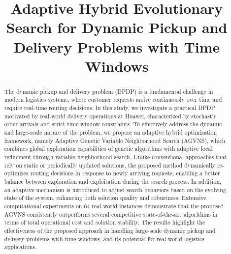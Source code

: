 \documentclass[]{interact}
\begin{document}
\title{Adaptive Hybrid Evolutionary Search for Dynamic Pickup and Delivery Problems with Time Windows}

\author{
}

\maketitle
\begin{abstract}

	
	
	
The dynamic pickup and delivery problem (DPDP) is a fundamental challenge in modern logistics systems, where customer requests arrive continuously over time and require real-time routing decisions. In this study, we investigate a practical DPDP motivated by real-world delivery operations at Huawei, characterized by stochastic order arrivals and strict time window constraints. To effectively address the dynamic and large-scale nature of the problem, we propose an adaptive hybrid optimization framework, namely Adaptive Genetic Variable Neighborhood Search (AGVNS), which combines global exploration capabilities of genetic algorithms with adaptive local refinement through variable neighborhood search.
Unlike conventional approaches that rely on static or periodically updated solutions, the proposed method dynamically re-optimizes routing decisions in response to newly arriving requests, enabling a better balance between exploration and exploitation during the search process. In addition, an adaptive mechanism is introduced to adjust search behaviors based on the evolving state of the system, enhancing both solution quality and robustness.
Extensive computational experiments on 64 real-world instances demonstrate that the proposed AGVNS consistently outperforms several competitive state-of-the-art algorithms in terms of total operational cost and solution stability. The results highlight the effectiveness of the proposed approach in handling large-scale dynamic pickup and delivery problems with time windows, and its potential for real-world logistics applications.
\end{abstract}
\end{document}
